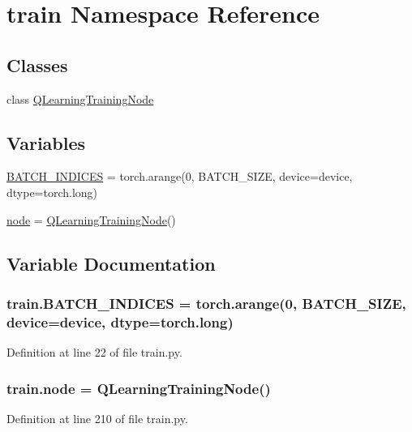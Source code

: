 \hypertarget{namespacetrain}{}\section{train Namespace Reference}
\label{namespacetrain}
\subsection*{Classes}
\begin{DoxyCompactItemize}
\item 
class \hyperlink{classtrain_1_1_q_learning_training_node}{Q\+Learning\+Training\+Node}
\end{DoxyCompactItemize}
\subsection*{Variables}
\begin{DoxyCompactItemize}
\item 
\hyperlink{namespacetrain_ab5b44727ca7567b7191d18956f4c4e64}{B\+A\+T\+C\+H\+\_\+\+I\+N\+D\+I\+C\+ES} = torch.\+arange(0, B\+A\+T\+C\+H\+\_\+\+S\+I\+ZE, device=device, dtype=torch.\+long)
\item 
\hyperlink{namespacetrain_a7c68a6981d3c74c76920e856fc7c2419}{node} = \hyperlink{classtrain_1_1_q_learning_training_node}{Q\+Learning\+Training\+Node}()
\end{DoxyCompactItemize}


\subsection{Variable Documentation}
\subsubsection[{\texorpdfstring{B\+A\+T\+C\+H\+\_\+\+I\+N\+D\+I\+C\+ES}{BATCH_INDICES}}]{\setlength{\rightskip}{0pt plus 5cm}train.\+B\+A\+T\+C\+H\+\_\+\+I\+N\+D\+I\+C\+ES = torch.\+arange(0, B\+A\+T\+C\+H\+\_\+\+S\+I\+ZE, device=device, dtype=torch.\+long)}\hypertarget{namespacetrain_ab5b44727ca7567b7191d18956f4c4e64}{}\label{namespacetrain_ab5b44727ca7567b7191d18956f4c4e64}


Definition at line 22 of file train.\+py.

\subsubsection[{\texorpdfstring{node}{node}}]{\setlength{\rightskip}{0pt plus 5cm}train.\+node = {\bf Q\+Learning\+Training\+Node}()}\hypertarget{namespacetrain_a7c68a6981d3c74c76920e856fc7c2419}{}\label{namespacetrain_a7c68a6981d3c74c76920e856fc7c2419}


Definition at line 210 of file train.\+py.

